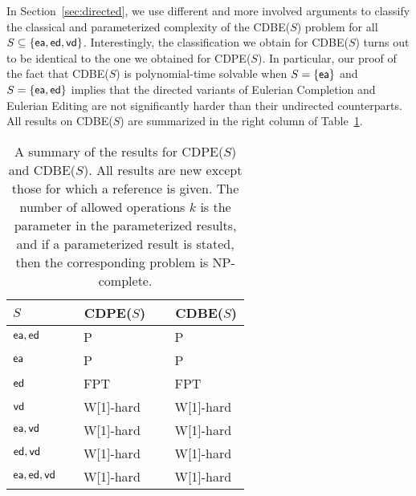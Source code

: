 \documentclass[11pt]{llncs}
\newcommand{\vd}{{\sf vd}}
\newcommand{\ed}{{\sf ed}}
\newcommand{\ea}{{\sf ea}}
\newcommand{\cdpe}{{\sc CDPE}}
\newcommand{\cdbe}{{\sc CDBE}}
\renewcommand{\P}{{\sf P}}
\newcommand{\NP}{{\sf NP}}
\newcommand{\FPT}{{\sf FPT}}
\newcommand{\W}{{\sf W[1]}}
\begin{document}
In Section~\ref{sec:directed}, we use different and more involved arguments to classify the classical and parameterized complexity of the \cdbe($S$) problem for all $S\subseteq \{\ea,\ed,\vd\}$. 
Interestingly, the classification we obtain for \cdbe($S$) turns out to be identical to the one we obtained for \cdpe($S$).  
In particular, our proof of the fact that \cdbe($S$) is polynomial-time solvable when $S=\{\ea\}$ and $S=\{\ea,\ed\}$ implies that the directed variants of {\sc Eulerian Completion} and {\sc Eulerian Editing} are not significantly harder than their undirected counterparts.
All results on \cdbe($S$) are summarized in the right column of Table~\ref{t-thetable}. 

\begin{table}[htb]
\begin{center}
\begin{tabular}{l|l|l}
$S$                    & $\;\;$ \cdpe($S$)                             & $\;\;$ \cdbe($S$)                           \\ \hline
$\ea,\ed$           & $\;\;$ \P                                             & $\;\;$ \P                                            \\
$\ea$                  & $\;\;$ \P                                             & $\;\;$  \P                                             \\
$\ed$                  & $\;\;$ \FPT~\cite{CyganMPPS14} &$\;\;$  \FPT~\cite{CyganMPPS14} \\
$\vd$                   & $\;\;$ \W-hard~\cite{CaiY11}$\;$               & $\;\;$ \W-hard~\cite{CyganMPPS14}\\
$\ea,\vd$            & $\;\;$ \W-hard                               & $\;\;$ \W-hard\\
$\ed,\vd$            & $\;\;$  \W-hard                              &$\;\;$  \W-hard \\
$\ea,\ed,\vd\;$     & $\;\;$ \W-hard                             & $\;\;$ \W-hard \\
\end{tabular}
\end{center}
\caption{A summary of the results for \cdpe($S$) and \cdbe($S$). All results are new except those for which a reference is given.
The number of allowed operations $k$ is the parameter in the parameterized results, and if a parameterized result is stated, then the corresponding problem is
\NP-complete.} 
\label{t-thetable}
\end{table}
\end{document}
